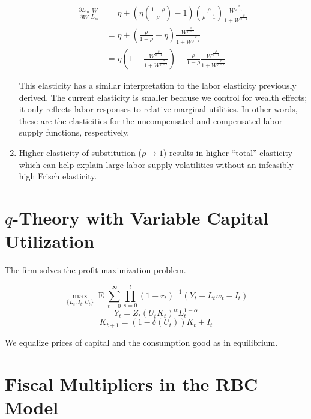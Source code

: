 \documentclass[11pt]{article}
\DeclareMathOperator{\ev}{E}
\begin{document}
\begin{enumerate}
        	\begin{align*}
        	\frac{\partial L_m}{\partial W} \frac{W}{L_m} &= \eta + \left( \eta \left( \frac{1-\rho}{\rho} \right) -1  \right) \left( \frac{\rho}{\rho-1} \right) \frac{W^{\frac{\rho}{\rho-1}}}{1 + W^{\frac{\rho}{\rho-1}}} \\
        	& = \eta + \left(  \frac{\rho}{1-\rho} - \eta \right) \frac{W^{\frac{\rho}{\rho-1}}}{1 + W^{\frac{\rho}{\rho-1}}} \\
            & = \eta \left ( 1 - \frac{W^{\frac{\rho}{\rho-1}}}{1 + W^{\frac{\rho}{\rho-1}}} \right ) + \frac{\rho}{1-\rho} \frac{W^{\frac{\rho}{\rho-1}}}{1 + W^{\frac{\rho}{\rho-1}}}
        	\end{align*}

        This elasticity has a similar interpretation to the labor elasticity previously derived. The current elasticity is smaller because we control for wealth effects; it only reflects labor responses to relative marginal utilities. In other words, these are the elasticities for the uncompensated and compensated labor supply functions, respectively.

        \item Higher elasticity of substitution ($\rho \to 1$) results in higher ``total'' elasticity which can help explain large labor supply volatilities without an infeasibly high Frisch elasticity.

    \end{enumerate}

\section{$q$-Theory with Variable Capital Utilization}

The firm solves the profit maximization problem.

    $$ \max_{\{L_t, I_t, U_t\}} \ev \sum_{t=0}^\infty \prod_{s=0}^t (1+r_t)^{-1} (Y_t - L_t w_t - I_t) $$
    $$ Y_t = Z_t (U_t K_t)^\alpha L_t^{1-\alpha} $$
    $$ K_{t+1} = (1-\delta(U_t))K_t + I_t $$

We equalize prices of capital and the consumption good as in equilibrium.

\section{Fiscal Multipliers in the RBC Model}
\end{document}
